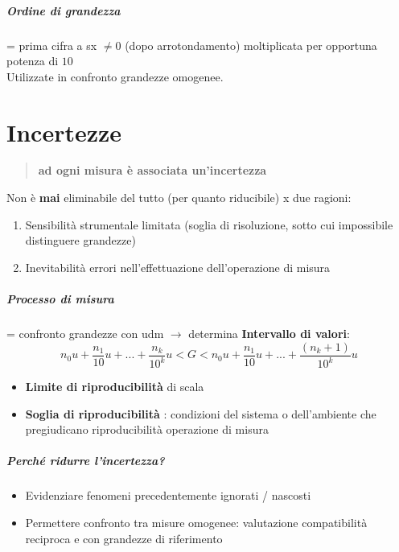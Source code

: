 \documentclass[10pt, oneside]{book}
\begin{document}
\paragraph{Ordine di grandezza} = prima cifra a sx $\neq 0$ (dopo arrotondamento) moltiplicata per opportuna potenza di $10$\\Utilizzate in confronto grandezze omogenee.

\chapter{Incertezze}
\begin{quote}
\textbf{ad ogni misura è associata un'incertezza}
\end{quote}
Non è \textbf{mai} eliminabile del tutto (per quanto riducibile) x due ragioni:
\begin{enumerate}
\item Sensibilità strumentale limitata (soglia di risoluzione, sotto cui impossibile distinguere grandezze)
\item Inevitabilità errori nell'effettuazione dell'operazione di misura
\end{enumerate}
\paragraph{Processo di misura} = confronto grandezze con udm $\rightarrow$ determina \textbf{Intervallo di valori}:
\[n_0 u + \frac{n_1}{10} u + ... + \frac{n_k}{10^k} u < G < n_0 u + \frac{n_1}{10} u + ... + \frac{(n_k+1)}{10^k} u\]
\begin{itemize}
\item \textbf{Limite di riproducibilità} di scala
\item \textbf{Soglia di riproducibilità} : condizioni del sistema o dell'ambiente che pregiudicano riproducibilità operazione di misura
\end{itemize}
\paragraph{Perché ridurre l'incertezza?}
\begin{itemize}
\item Evidenziare fenomeni precedentemente ignorati / nascosti
\item Permettere confronto tra misure omogenee: valutazione compatibilità reciproca e con grandezze di riferimento
\end{itemize}
\end{document}
